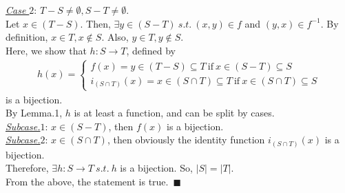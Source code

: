 \documentclass[12pt]{article}
\begin{document}
\underline{\textit{Case $2$}}: $T - S \neq \emptyset, S - T \neq \emptyset$.\\[1em]
Let $x \in (T - S)$. Then, $\exists y \in (S-T) ~s.t.~ (x,y) \in f$ and $(y,x) \in f^{-1}$. By definition, $x \in T, x \notin S$. Also, $y \in T, y \notin S$.\\[1em]
Here, we show that $h: S \longrightarrow T$, defined by
\begin{gather*}
h(x) = \left\{
\begin{array}{c}
    f(x) = y \in (T-S) \subseteq T ~\mathrm{if}~ x \in (S-T) \subseteq S\\[1em]
    i_{(S \cap T)}(x) = x \in (S \cap T) \subseteq T ~\mathrm{if}~ x \in (S \cap T) \subseteq S
\end{array}
\right.
\end{gather*}
is a bijection.\\[1em]
By Lemma.1, $h$ is at least a function, and can be split by cases.\\
\underline{\textit{Subcase.$1$}}: $x \in (S-T)$, then $f(x)$ is a bijection.\\
\underline{\textit{Subcase.$2$}}: $x \in (S \cap T)$, then obviously the identity function $i_{(S \cap T)}(x)$ is a bijection.\\[1em]
Therefore, $\exists h: S \longrightarrow T ~s.t.~ h$ is a bijection. So, $|S| = |T|$.\\[1em]
From the above, the statement is true.~$\blacksquare$
\end{document}
